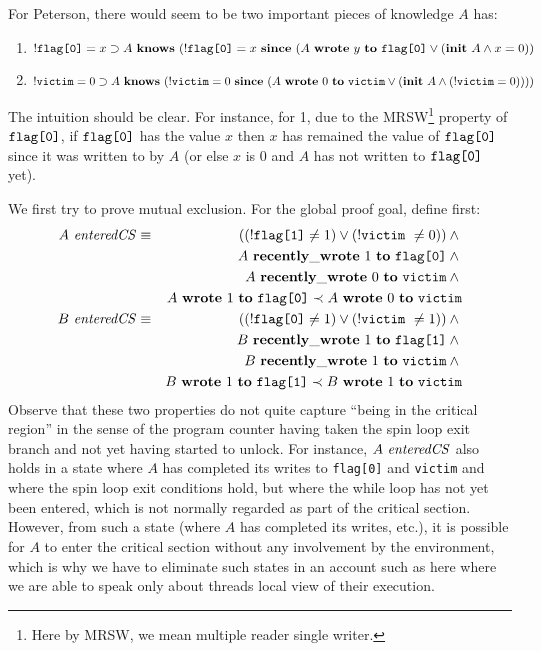 %
For Peterson, there would seem to be two important pieces of knowledge $A$ has:
%
\begin{enumerate}
\item $!\FlagZero = x \Implies A\ \Knows\ (!\FlagZero = x\ \Since\ (A\ \Writes\ y\ \To\ \FlagZero \vee (\Init\ A \wedge x=0))$
\item $!\Victim = 0 \Implies A\ \Knows\ (!\Victim = 0\ \Since\ (A\ \Writes\ 0\ \To\ \Victim \vee (\Init\ A \wedge (!\Victim = 0))))$
\end{enumerate}
%
The intuition should be clear. For instance, for 1, due to the MRSW\footnote{Here by MRSW, we mean multiple reader single writer.} property of $\texttt{flag[0]}$,
if $\texttt{flag[0]}$ has the value $x$ then $x$ has remained the value of $\texttt{flag[0]}$ since it was written to by $A$ (or else $x$ is 0 and
$A$ has not written to $\texttt{flag[0]}$ yet).

We first try to prove mutual exclusion. For the global proof goal, define first:
%
\begin{eqnarray*}
A\ \EntersCS & \equiv & ((!\FlagOne \neq 1) \vee (!\Victim\ \neq 0)) \wedge \mbox{} \\
 & & A\ \RecentlyWrote\ 1\ \To\ \FlagZero \wedge \mbox{} \\
  & & A\ \RecentlyWrote\ 0\ \To\ \Victim \wedge \mbox{}  \\
  & & A\ \Writes\ 1\ \To\ \FlagZero \HappensBefore A\ \Writes\ 0\ \To\ \Victim \\
B\ \EntersCS & \equiv & ((!\FlagZero \neq 1) \vee (!\Victim\ \neq 1)) \wedge \mbox{} \\
 & & B\ \RecentlyWrote\ 1\ \To\ \FlagOne \wedge \mbox{} \\
  & & B\ \RecentlyWrote\ 1\ \To\ \Victim \wedge \mbox{}  \\
  & & B\ \Writes\ 1\ \To\ \FlagOne \HappensBefore B\ \Writes\ 1\ \To\ \Victim
\end{eqnarray*}
%
Observe that these two properties do not quite capture ``being in the critical region'' in the sense of the program counter having taken the spin loop
exit branch and not yet having started to unlock. For instance, $A\ \EntersCS$ also holds in a state where $A$ has completed its writes to
\texttt{flag[0]} and \texttt{victim} and where the spin loop exit conditions hold, but where the while loop has not yet been entered, which is not
normally regarded as part of the critical section. However, from such a state (where $A$ has completed its writes, etc.), it is possible for $A$ to
enter the critical section without any involvement by the environment, which is why we have to eliminate such states in an account such as here
where we are able to speak only about threads local view of their execution.


